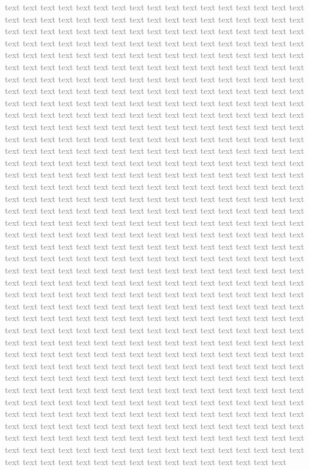 \documentclass[sigconf]{acmart}
\begin{document}
\textcolor{gray}{
    text text text text text text text text text text text text text text text text text text text text text text text text text text text text text text text text text text text text text text text text text text text text text text text text text text text text text text text text text text text text text text text text text text text text text text text text text text text text text text text text text text text text text text text text text text text text text text text text text text text text text text text text text text text text text text text text text text text text text text text text text text text text text text text text text text text text text text text text text text text text text text text text text text text text text text text text text text text text text text text text text text text text text text text text text text text text text text text text text text text text text text text text text text text text text text text text text text text text text text text text text text text text text text text text text text text text text text text text text text text text text text text text text text text text text text text text text text text text text text text text text text text text text text text text text text text text text text text text text text text text text text text text text text text text text text text text text text text text text text text text text text text text text text text text text text text text text text text text text text text text text text text text text text text text text text text text text text text text text text text text text text text text text text text text text text text text text text text text text text text text text text text text text text text text text text text text text text text text text text text text text text text text text text text text text text text text text text text text text text text text text text text text text text text text text text text text text text text text text text text text text text text text text text text text text text text text text text text text text text text text text text text text text text text text text text text text text text text text text text text text text text text text text text text text text text text text text text text text text text text text text text text text text text text text text text text text text text text text text text text text text text text text text text text text text text text text text text text text text text text text text text text text text text text text text text text text text text text text text text text text text text text text text text text text text text text text text text text text text text text text text text text text text text text text text text text text text text text text text text text text text text text text text text text text text text text text text text text text text text text text text text text text text text text text text text text text text text text text text text text text text text text text text text text text text text text text text text text text text text text text text text text text text text text text text text text text text text text text text text text text text text text text text text text text text text text text text text text text text text text text text text }
\end{document}

